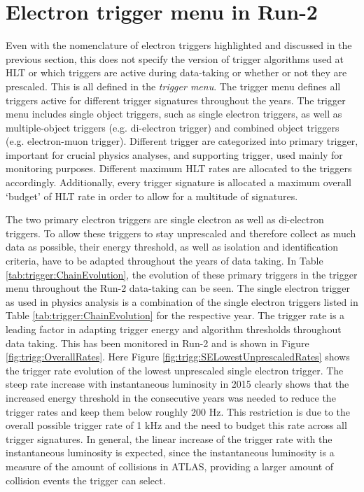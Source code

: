 \section{Electron trigger menu in Run-2}
\label{sec:trigg:Menu}  
Even with the nomenclature of electron triggers highlighted and discussed in the previous section,  this does not specify the version of trigger algorithms used at \ac{HLT} or which triggers are active during data-taking or whether or not they are prescaled.  This is all defined in the \textit{trigger menu}.
The trigger menu defines all triggers active for different trigger signatures throughout the years.  The trigger menu includes single object triggers,  such as single electron triggers, as well as multiple-object triggers (e.g. di-electron trigger) and combined object triggers (e.g. electron-muon trigger).  Different trigger are categorized into primary trigger,  important for crucial physics analyses,  and supporting trigger,  used mainly for monitoring purposes.  Different maximum \ac{HLT} rates are allocated to the triggers accordingly.  Additionally,  every trigger signature is allocated a maximum overall `budget'  of \ac{HLT} rate in order to allow for a multitude of signatures.  

The two primary electron triggers are single electron as well as di-electron triggers.  To allow these triggers to stay unprescaled and therefore collect as much data as possible,  their energy threshold, as well as isolation and identification criteria, have to be adapted throughout the years of data taking.
In Table \ref{tab:trigger:ChainEvolution},  the evolution of these primary triggers in the trigger menu throughout the Run-2 data-taking can be seen. 
The single electron trigger as used in physics analysis is a combination of the single electron triggers listed in Table \ref{tab:trigger:ChainEvolution} for the respective year.  The trigger rate is a leading factor in adapting trigger energy and algorithm thresholds throughout data taking.  This has been monitored in Run-2 and is shown in Figure \ref{fig:trigg:OverallRates}.  Here Figure \ref{fig:trigg:SELowestUnprescaledRates} shows the trigger rate evolution of the lowest unprescaled single electron trigger.  The steep rate increase with instantaneous luminosity in 2015 clearly shows that the increased energy threshold in the consecutive years was needed to reduce the trigger rates and keep them below roughly 200 Hz. This restriction is due to the overall possible trigger rate of 1 kHz and the need to budget this rate across all trigger signatures.  In general,  the linear increase of the trigger rate with the instantaneous luminosity is expected,  since the instantaneous luminosity is a measure of the amount of collisions in \ac{ATLAS},  providing a larger amount of collision events the trigger can select.  \\

